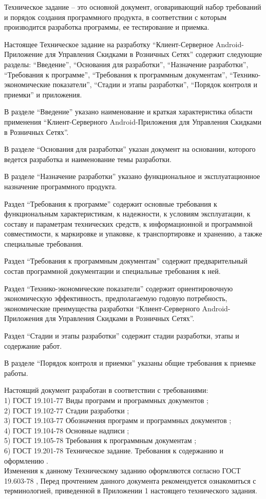 
\tab[0.75cm] Техническое задание – это основной документ, оговаривающий набор требований и
порядок создания программного продукта, в соответствии с которым производится разработка
программы, ее тестирование и приемка.

Настоящее Техническое задание на разработку ``Клиент-Серверное Android-Приложение для Управления Скидками в Розничных Сетях'' содержит следующие разделы: ``Введение'', ``Основания для разработки'',
``Назначение разработки'', ``Требования к программе'', ``Требования к программным документам'',
``Технико-экономические показатели'', ``Стадии и этапы разработки'', ``Порядок контроля и
приемки'' и приложения.

В разделе ``Введение'' указано наименование и краткая характеристика области применения
``Клиент-Серверного Android-Приложения для Управления Скидками в Розничных Сетях''.

В разделе ``Основания для разработки'' указан документ на основании, которого ведется
разработка и наименование темы разработки.

В разделе ``Назначение разработки'' указано функциональное и эксплуатационное
назначение программного продукта.

Раздел ``Требования к программе'' содержит основные требования к функциональным
характеристикам, к надежности, к условиям эксплуатации, к составу и параметрам технических
средств, к информационной и программной совместимости, к маркировке и упаковке, к
транспортировке и хранению, а также специальные требования.

Раздел ``Требования к программным документам'' содержит предварительный состав
программной документации и специальные требования к ней.

Раздел ``Технико-экономические показатели'' содержит ориентировочную экономическую
эффективность, предполагаемую годовую потребность, экономические преимущества разработки
``Клиент-Серверного Android-Приложения для Управления Скидками в Розничных Сетях''.

Раздел ``Стадии и этапы разработки'' содержит стадии разработки, этапы и содержание
работ.

В разделе ``Порядок контроля и приемки'' указаны общие требования к приемке работы.

Настоящий документ разработан в соответствии с требованиями:\\
1) ГОСТ 19.101-77 Виды программ и программных документов \cite{gost_types_of_software};\\
2) ГОСТ 19.102-77 Стадии разработки \cite{gost_stages_of_devel};\\
3) ГОСТ 19.103-77 Обозначения программ и программных документов \cite{gost_marking_software};\\
4) ГОСТ 19.104-78 Основные надписи \cite{gost_main_signs};\\
5) ГОСТ 19.105-78 Требования к программным документам \cite{gost_demands_for_docs};\\
6) ГОСТ 19.201-78 Техническое задание. Требования к содержанию и оформлению \cite{gost_tz}.\\

Изменения к данному Техническому заданию оформляются согласно ГОСТ 19.603-78 \cite{gost_main_rules_change},
Перед прочтением данного документа рекомендуется ознакомиться с терминологией,
приведенной в Приложении 1 настоящего технического задания.
